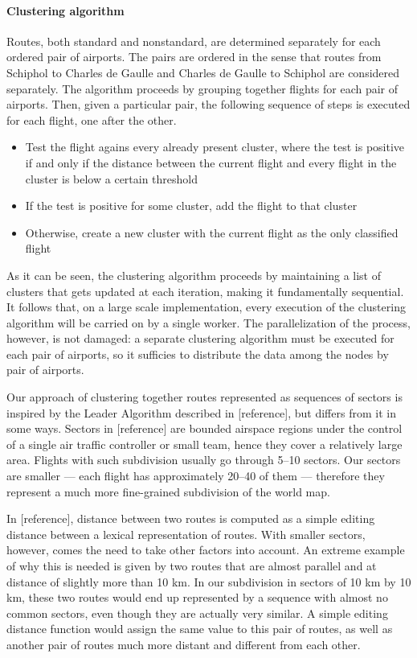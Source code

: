 \documentclass{vldb}
\begin{document}
\paragraph{Clustering algorithm}

Routes, both standard and nonstandard, are determined separately for each
ordered pair of airports. The pairs are ordered in the sense that routes from
Schiphol to Charles de Gaulle and Charles de Gaulle to Schiphol are considered
separately. The algorithm proceeds by grouping together flights for each pair of
airports. Then, given a particular pair, the following sequence of steps is
executed for each flight, one after the other.

\begin{itemize}
  \item Test the flight agains every already present cluster, where the test is
  positive if and only if the distance between the current flight and every
  flight in the cluster is below a certain threshold
  \item If the test is positive for some cluster, add the flight to that cluster
  \item Otherwise, create a new cluster with the current flight as the only
  classified flight
\end{itemize}

As it can be seen, the clustering algorithm proceeds by maintaining a list of
clusters that gets updated at each iteration, making it fundamentally
sequential. It follows that, on a large scale implementation, every execution of
the clustering algorithm will be carried on by a single worker. The
parallelization of the process, however, is not damaged: a separate clustering
algorithm must be executed for each pair of airports, so it sufficies to
distribute the data among the nodes by pair of airports.

Our approach of clustering together routes represented as sequences of sectors
is inspired by the Leader Algorithm described in [reference], but differs from
it in some ways. Sectors in [reference] are bounded airspace regions under the
control of a single air traffic controller or small team, hence they cover a
relatively large area. Flights with such subdivision usually go through 5--10
sectors. Our sectors are smaller --- each flight has approximately 20--40 of
them --- therefore they represent a much more fine-grained subdivision of the
world map.

In [reference], distance between two routes is computed as a simple editing
distance between a lexical representation of routes. With smaller sectors,
however, comes the need to take other factors into account. An extreme example
of why this is needed is given by two routes that are almost parallel and at
distance of slightly more than 10 km. In our subdivision in sectors of 10 km by
10 km, these two routes would end up represented by a sequence with almost no
common sectors, even though they are actually very similar. A simple editing
distance function would assign the same value to this pair of routes, as well as
another pair of routes much more distant and different from each other.
\end{document}
